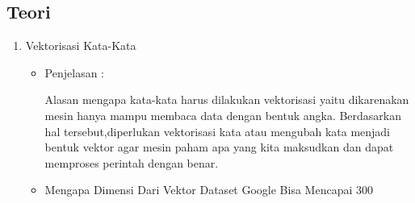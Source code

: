 \subsection{Teori}
\begin{enumerate}
\item Vektorisasi Kata-Kata
\begin{itemize}
\item Penjelasan :
\par Alasan mengapa kata-kata harus dilakukan vektorisasi yaitu dikarenakan mesin hanya mampu membaca data dengan bentuk angka. Berdasarkan hal tersebut,diperlukan vektorisasi kata atau mengubah kata menjadi bentuk vektor agar mesin  paham apa yang kita maksudkan dan dapat memproses perintah dengan benar.
\item Mengapa Dimensi Dari Vektor Dataset Google Bisa Mencapai 300



\end{itemize}
\end{enumerate}
